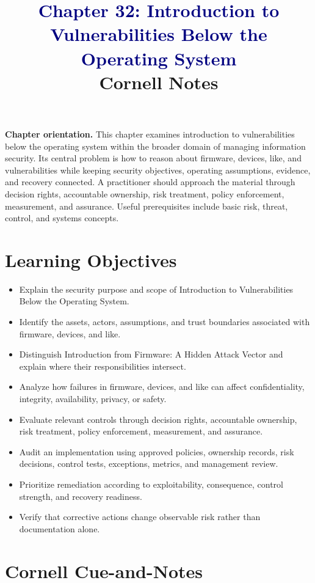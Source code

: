 \documentclass[11pt]{article}
\title{\textcolor{Navy}{Chapter 32: Introduction to Vulnerabilities Below the Operating System}\\[2mm]\large Cornell Notes}
\author{}
\date{}
\begin{document}
\maketitle
\thispagestyle{fancy}
\vspace{-1.5em}
\begin{orientationbox}
\textbf{Chapter orientation.} This chapter examines introduction to vulnerabilities below the operating system within the broader domain of managing information security. Its central problem is how to reason about firmware, devices, like, and vulnerabilities while keeping security objectives, operating assumptions, evidence, and recovery connected. A practitioner should approach the material through decision rights, accountable ownership, risk treatment, policy enforcement, measurement, and assurance. Useful prerequisites include basic risk, threat, control, and systems concepts.
\end{orientationbox}
\section*{Learning Objectives}
\begin{itemize}
\item Explain the security purpose and scope of Introduction to Vulnerabilities Below the Operating System.
\item Identify the assets, actors, assumptions, and trust boundaries associated with firmware, devices, and like.
\item Distinguish Introduction from Firmware: A Hidden Attack Vector and explain where their responsibilities intersect.
\item Analyze how failures in firmware, devices, and like can affect confidentiality, integrity, availability, privacy, or safety.
\item Evaluate relevant controls through decision rights, accountable ownership, risk treatment, policy enforcement, measurement, and assurance.
\item Audit an implementation using approved policies, ownership records, risk decisions, control tests, exceptions, metrics, and management review.
\item Prioritize remediation according to exploitability, consequence, control strength, and recovery readiness.
\item Verify that corrective actions change observable risk rather than documentation alone.
\end{itemize}
\section*{Cornell Cue-and-Notes}
\end{document}
